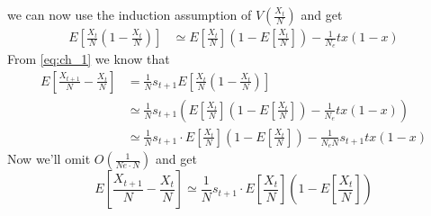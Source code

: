 \documentclass[11pt]{article}
\begin{document}
we can now use the induction assumption of $V(\frac{X_t}{N})$ and get
\begin{equation}
\begin{split}
E\left[\frac{X_t}{N}\left(1-\frac{X_t}{N}\right)\right] &\simeq
E\left[\frac{X_t}{N}\right]\left(1-E\left[\frac{X_t}{N}\right]\right)-\frac{1}{N_e}tx(1-x)
\end{split}
\end{equation}
From \cref{eq:ch_1} we know that
\begin{equation}
\begin{split}
E\left[\frac{X_{t+1}}{N}-\frac{X_t}{N}\right] &= \frac{1}{N}s_{t+1}E\left[\frac{X_t}{N}\left(1-\frac{X_t}{N}\right)\right] \\
&\simeq \frac{1}{N}s_{t+1}\left(E\left[\frac{X_t}{N}\right]\left(1-E\left[\frac{X_t}{N}\right]\right) - \frac{1}{N_e}tx(1-x)\right) \\
&\simeq \frac{1}{N}s_{t+1}\cdot E\left[\frac{X_t}{N}\right]\left(1-E\left[\frac{X_t}{N}\right]\right) - \frac{1}{N_e N}s_{t+1}tx(1-x)
\end{split}
\end{equation}
Now we'll omit $O(\frac{1}{Ne\cdot N})$ and get
\begin{equation}\label{eq:ch_2}
E\left[\frac{X_{t+1}}{N}-\frac{X_t}{N}\right] \simeq \frac{1}{N}s_{t+1}\cdot E\left[\frac{X_t}{N}\right]\left(1-E\left[\frac{X_t}{N}\right]\right)
\end{equation}
\end{document}
